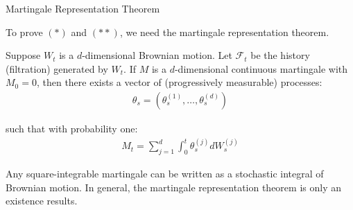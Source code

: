 \documentclass{beamer}
\begin{document}
\begin{frame}{Martingale Representation Theorem}

    {\footnotesize \footnotesize
    \par To prove $(*)$ and $(**)$, we need the martingale representation theorem.
    \vspace{1em}
    \par  \pause Suppose $W_t$ is a $d$-dimensional Brownian motion. Let $\mathcal{F}_t$ be the history (filtration)
     generated by $W_t$. If $M$ is a $d$-dimensional continuous martingale with $M_0 = 0$, then there exists
      a vector of (progressively measurable) processes:
      \begin{align*}
        \theta_s = (\theta^{(1)}_s, \ldots, \theta^{(d)}_s)
      \end{align*}
      \par  \pause such that with probability one:
      \begin{align*}
        M_t = \sum_{j=1}^d \int_0^t \theta^{(j)}_s dW^{(j)}_s
      \end{align*}
      \par  \pause Any square-integrable martingale can be written as a stochastic integral of Brownian motion. In general, the martingale representation
theorem is only an existence results.
    }

\end{frame} 
\end{document}
